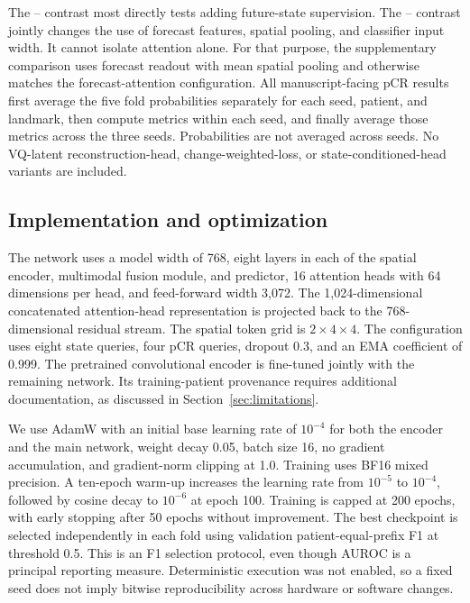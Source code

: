 The \direct{}--\nojepa{} contrast most directly tests adding future-state supervision. The \fullmodel{}--\direct{} contrast jointly changes the use of forecast features, spatial pooling, and classifier input width. It cannot isolate attention alone. For that purpose, the supplementary \meanmodel{} comparison uses forecast readout with mean spatial pooling and otherwise matches the forecast-attention configuration. All manuscript-facing pCR results first average the five fold probabilities separately for each seed, patient, and landmark, then compute metrics within each seed, and finally average those metrics across the three seeds. Probabilities are not averaged across seeds. No VQ-latent reconstruction-head, change-weighted-loss, or state-conditioned-head variants are included.

\subsection{Implementation and optimization}
The network uses a model width of 768, eight layers in each of the spatial encoder, multimodal fusion module, and predictor, 16 attention heads with 64 dimensions per head, and feed-forward width 3,072. The 1,024-dimensional concatenated attention-head representation is projected back to the 768-dimensional residual stream. The spatial token grid is $2\times4\times4$. The configuration uses eight state queries, four pCR queries, dropout 0.3, and an EMA coefficient of 0.999. The pretrained convolutional encoder is fine-tuned jointly with the remaining network. Its training-patient provenance requires additional documentation, as discussed in Section~\ref{sec:limitations}.

We use AdamW \citep{adamw2019} with an initial base learning rate of $10^{-4}$ for both the encoder and the main network, weight decay 0.05, batch size 16, no gradient accumulation, and gradient-norm clipping at 1.0. Training uses BF16 mixed precision. A ten-epoch warm-up increases the learning rate from $10^{-5}$ to $10^{-4}$, followed by cosine decay to $10^{-6}$ at epoch 100. Training is capped at 200 epochs, with early stopping after 50 epochs without improvement. The best checkpoint is selected independently in each fold using validation patient-equal-prefix F1 at threshold 0.5. This is an F1 selection protocol, even though AUROC is a principal reporting measure. Deterministic execution was not enabled, so a fixed seed does not imply bitwise reproducibility across hardware or software changes.

